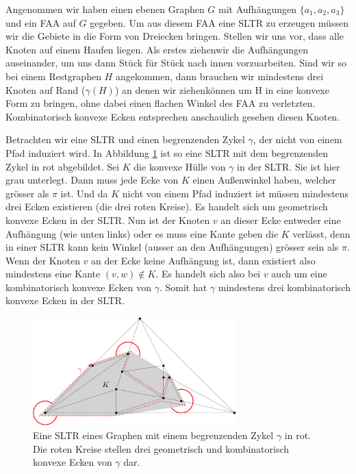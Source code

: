 \begin{remark}
Angenommen wir haben einen ebenen Graphen $G$ mit Aufhängungen $\{a_1,a_2,a_3\}$ und ein FAA auf $G$ gegeben. Um aus diesem FAA eine SLTR zu erzeugen müssen wir die Gebiete in die Form von Dreiecken bringen. Stellen wir uns vor, dass alle Knoten auf einem Haufen liegen. Als erstes \glqq ziehen\grqq{ }wir die Aufhängungen auseinander, um uns dann Stück für Stück nach innen vorzuarbeiten. Sind wir so bei einem Restgraphen $H$ angekommen, dann brauchen wir mindestens drei Knoten auf Rand ($\gamma(H)$) an denen wir \glqq ziehen\grqq{ }können um H in eine konvexe Form zu bringen, ohne dabei einen flachen Winkel des FAA zu verletzten. Kombinatorisch konvexe Ecken entsprechen anschaulich gesehen diesen Knoten.
\end{remark}

\begin{example}
Betrachten wir eine SLTR und einen begrenzenden Zykel $\gamma$, der nicht von einem Pfad induziert wird. In Abbildung \ref{pic_exp_cycle} ist so eine SLTR mit dem begrenzenden Zykel in rot abgebildet. Sei $K$ die konvexe Hülle von $\gamma$ in der SLTR. Sie ist hier grau unterlegt. Dann muss jede Ecke von $K$ einen Außenwinkel haben, welcher grösser als $\pi$ ist. Und da $K$ nicht von einem Pfad induziert ist müssen mindestens drei Ecken existieren (die drei roten Kreise). Es handelt sich um geometrisch konvexe Ecken in der SLTR. Nun ist der Knoten $v$ an dieser Ecke entweder eine Aufhängung (wie unten links) oder es muss eine Kante geben die $K$ verlässt, denn in einer SLTR kann kein Winkel (ausser an den Aufhängungen) grösser sein als $\pi$. Wenn der Knoten $v$ an der Ecke keine Aufhängung ist, dann existiert also mindestens eine Kante $(v,w) \notin K$. Es handelt sich also bei $v$ auch um eine kombinatorisch konvexe Ecken von $\gamma$. Somit hat $\gamma$ mindestens drei kombinatorisch konvexe Ecken in der SLTR. 
\end{example}

\begin{figure}[h]
	\centering
  \includegraphics[width=0.7\textwidth]{exp_cycle.png}
  \caption{Eine SLTR eines Graphen mit einem begrenzenden Zykel $\gamma$ in rot. Die roten Kreise stellen drei geometrisch und kombinatorisch konvexe Ecken von $\gamma$ dar.}
  \label{pic_exp_cycle}
\end{figure}

